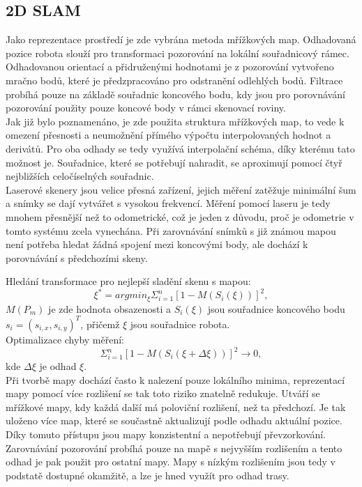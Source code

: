 \documentclass[12pt]{report}
\begin{document}
\subsection{2D SLAM}
Jako reprezentace prostředí je zde vybrána metoda mřížkových map. Odhadovaná pozice robota slouží pro transformaci pozorování na lokální souřadnicový rámec. Odhadovanou orientací a přidruženými hodnotami je z pozorování vytvořeno mračno bodů, které je předzpracováno pro odstranění odlehlých bodů. Filtrace probíhá pouze na základě souřadnic koncového bodu, kdy jsou pro porovnávání pozorování použity pouze koncové body v rámci skenovací roviny.\\
\indent Jak již bylo poznamenáno, je zde použita struktura mřížkových map, to vede k omezení přesnosti a neumožnění přímého výpočtu interpolovaných hodnot a derivátů. Pro oba odhady se tedy využívá interpolační schéma, díky kterému tato možnost je. Souřadnice, které se potřebují nahradit, se aproximují pomocí čtyř nejbližších celočíselných souřadnic. \\
\indent Laserové skenery jsou velice přesná zařízení, jejich měření zatěžuje minimální šum a snímky se dají vytvářet s vysokou frekvencí. Měření pomocí laseru je tedy mnohem přesnější než to odometrické, což je jeden z důvodu, proč je odometrie v tomto systému zcela vynechána. Při zarovnávání snímků s již známou mapou není potřeba hledat žádná spojení mezi koncovými body, ale dochází k porovnávání s předchozími skeny.  

Hledání transformace pro nejlepší sladění skenu s mapou:
\begin{equation}
	\xi^*=argmin_\xi\Sigma_{i=1}^n[1-M(S_i(\xi))]^2,
\end{equation}
$M(P_m)$ je zde hodnota obsazenosti a $S_i(\xi)$ jsou souřadnice koncového bodu $s_i=(s_{i,x},s_{i,y})^T$, přičemž $\xi$ jsou souřadnice robota.\\
 
Optimalizace chyby měření: 
\begin{equation}
	\Sigma_{i=1}^n[1-M(S_i(\xi+\Delta\xi))]^2\rightarrow 0,
\end{equation}
kde $\Delta\xi$ je odhad $\xi$.\\
\indent Při tvorbě mapy dochází často k nalezení pouze lokálního minima, reprezentací mapy pomocí více rozlišení se tak toto riziko znatelně redukuje. Utváří se mřížkové mapy, kdy každá další má poloviční rozlišení, než ta předchozí. Je tak uloženo více map, které se součastně aktualizují podle odhadu aktuální pozice. Díky tomuto přístupu jsou mapy konzistentní a nepotřebují převzorkování. Zarovnávání pozorování probíhá pouze na mapě s nejvyšším rozlišením a tento odhad je pak použit pro ostatní mapy. Mapy s nízkým rozlišením jsou tedy v podstatě dostupné okamžitě, a lze je hned využít pro odhad trasy. 
\end{document}
